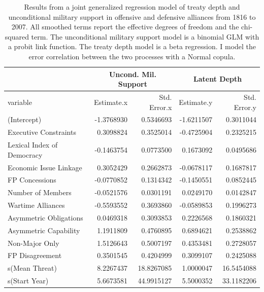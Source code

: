 \documentclass[12pt]{article}
\begin{document}
\begin{table}[ht]
\centering
\begin{tabular}{lrrrr}
  & \multicolumn{2}{c}{Uncond. Mil. Support} & \multicolumn{2}{c}{Latent Depth}\\ \hline
variable & Estimate.x & Std. Error.x & Estimate.y & Std. Error.y \\ 
  \hline
(Intercept) & -1.3768930 & 0.5346693 & -1.6211507 & 0.3011044 \\ 
  Executive Constraints & 0.3098824 & 0.3525014 & -0.4725904 & 0.2325215 \\ 
  Lexical Index of Democracy & -0.1463754 & 0.0773500 & 0.1673092 & 0.0495686 \\ 
  Economic Issue Linkage & 0.3052429 & 0.2662873 & -0.0678117 & 0.1687817 \\ 
  FP Concessions & -0.0770852 & 0.1314342 & -0.1450551 & 0.0852445 \\ 
  Number of Members & -0.0521576 & 0.0301191 & 0.0249170 & 0.0142847 \\ 
  Wartime Alliances & -0.5593552 & 0.3693860 & -0.0589853 & 0.1996273 \\ 
  Asymmetric Obligations & 0.0469318 & 0.3093853 & 0.2226568 & 0.1860321 \\ 
  Asymmetric Capability & 1.1911809 & 0.4760895 & 0.6894621 & 0.2538862 \\ 
  Non-Major Only & 1.5126643 & 0.5007197 & 0.4353481 & 0.2728057 \\ 
  FP Disagreement & 0.3501545 & 0.4204999 & 0.3099107 & 0.2425088 \\ 
  s(Mean Threat) & 8.2267437 & 18.8267085 & 1.0000047 & 16.5454088 \\ 
  s(Start Year) & 5.6673581 & 44.9915127 & 5.5000352 & 33.1182206 \\ 
   \hline
\end{tabular}
\caption{Results from a joint generalized regression model of treaty depth and unconditional military support in 
         offensive and defensive alliances from 1816 to 2007. 
                     All smoothed terms report the effective degrees of freedom and the chi-squared term. 
                     The unconditional military support model is a binomial GLM with a probit link function. 
                     The treaty depth model is a beta regression. 
                     I model the error correlation between the two processes with a Normal copula.} 
\label{tab:gjrm-res}
\end{table}
\end{document}

